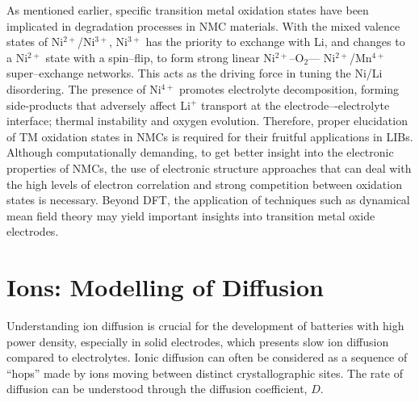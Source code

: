 \documentclass[journal=jacsat,manuscript=article]{achemso}
\begin{document}
As mentioned earlier, specific transition metal oxidation states have been implicated in degradation processes in NMC materials.
With the mixed valence states of Ni$^{2+}$/Ni$^{3+}$, Ni$^{3+}$ has the priority to exchange with Li, and changes to a Ni$^{2+}$ state with a spin--flip, to form strong linear Ni$^{2+}$–O$_2$–– Ni$^{2+}$/Mn$^{4+}$ super--exchange networks.\cite{zheng2019,Zheng-acs.jpclett-2017}
This acts as the driving force in tuning the Ni/Li disordering.
The presence of Ni$^{4+}$ promotes electrolyte decomposition, forming side-products that adversely affect Li$^+$ transport at the electrode–-electrolyte interface; thermal instability and oxygen evolution.\cite{bak2014structural}
Therefore, proper elucidation of TM oxidation states in NMCs is required for their fruitful applications in LIBs.
Although computationally demanding, to get better insight into the electronic properties of NMCs, the use of electronic structure approaches that can deal with the high levels of electron correlation and strong competition between oxidation states is necessary.
Beyond DFT, the application of techniques such as dynamical mean field theory may yield important insights into transition metal oxide electrodes.

\section*{Ions: Modelling of Diffusion}
Understanding ion diffusion is crucial for the development of batteries with high power density, especially in solid electrodes, which presents slow ion diffusion compared to electrolytes.
Ionic diffusion can often be considered as a sequence of ``hops'' made by ions moving between distinct crystallographic sites.\cite{catlow1983static}
The rate of diffusion can be understood through the diffusion coefficient, $D$. 
\end{document}

